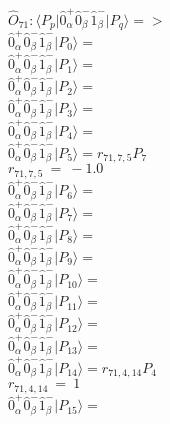 \documentclass[14pt]{article}
\begin{document}
    $\hat{O}_{71}:  \langle{P_p}\vert \hat{0}_{\alpha}^{+}\hat{0}_{\beta}^{-}\hat{1}_{\beta}^{-} \vert{P_q}\rangle => $ \\ 
    $ \hat{0}_{\alpha}^{+}\hat{0}_{\beta}^{-}\hat{1}_{\beta}^{-} \vert{P_{0}}\rangle =  $ \\ 
    $ \hat{0}_{\alpha}^{+}\hat{0}_{\beta}^{-}\hat{1}_{\beta}^{-} \vert{P_{1}}\rangle =  $ \\ 
    $ \hat{0}_{\alpha}^{+}\hat{0}_{\beta}^{-}\hat{1}_{\beta}^{-} \vert{P_{2}}\rangle =  $ \\ 
    $ \hat{0}_{\alpha}^{+}\hat{0}_{\beta}^{-}\hat{1}_{\beta}^{-} \vert{P_{3}}\rangle =  $ \\ 
    $ \hat{0}_{\alpha}^{+}\hat{0}_{\beta}^{-}\hat{1}_{\beta}^{-} \vert{P_{4}}\rangle =  $ \\ 
    $ \hat{0}_{\alpha}^{+}\hat{0}_{\beta}^{-}\hat{1}_{\beta}^{-} \vert{P_{5}}\rangle = {r}_{71,7,5}P_{7} $ \\ 
    ${r}_{71,7,5}\ =\ -1.0 $ \\ 
    $ \hat{0}_{\alpha}^{+}\hat{0}_{\beta}^{-}\hat{1}_{\beta}^{-} \vert{P_{6}}\rangle =  $ \\ 
    $ \hat{0}_{\alpha}^{+}\hat{0}_{\beta}^{-}\hat{1}_{\beta}^{-} \vert{P_{7}}\rangle =  $ \\ 
    $ \hat{0}_{\alpha}^{+}\hat{0}_{\beta}^{-}\hat{1}_{\beta}^{-} \vert{P_{8}}\rangle =  $ \\ 
    $ \hat{0}_{\alpha}^{+}\hat{0}_{\beta}^{-}\hat{1}_{\beta}^{-} \vert{P_{9}}\rangle =  $ \\ 
    $ \hat{0}_{\alpha}^{+}\hat{0}_{\beta}^{-}\hat{1}_{\beta}^{-} \vert{P_{10}}\rangle =  $ \\ 
    $ \hat{0}_{\alpha}^{+}\hat{0}_{\beta}^{-}\hat{1}_{\beta}^{-} \vert{P_{11}}\rangle =  $ \\ 
    $ \hat{0}_{\alpha}^{+}\hat{0}_{\beta}^{-}\hat{1}_{\beta}^{-} \vert{P_{12}}\rangle =  $ \\ 
    $ \hat{0}_{\alpha}^{+}\hat{0}_{\beta}^{-}\hat{1}_{\beta}^{-} \vert{P_{13}}\rangle =  $ \\ 
    $ \hat{0}_{\alpha}^{+}\hat{0}_{\beta}^{-}\hat{1}_{\beta}^{-} \vert{P_{14}}\rangle = {r}_{71,4,14}P_{4} $ \\ 
    ${r}_{71,4,14}\ =\ 1 $ \\ 
    $ \hat{0}_{\alpha}^{+}\hat{0}_{\beta}^{-}\hat{1}_{\beta}^{-} \vert{P_{15}}\rangle =  $ \\ 
    
\end{document}
